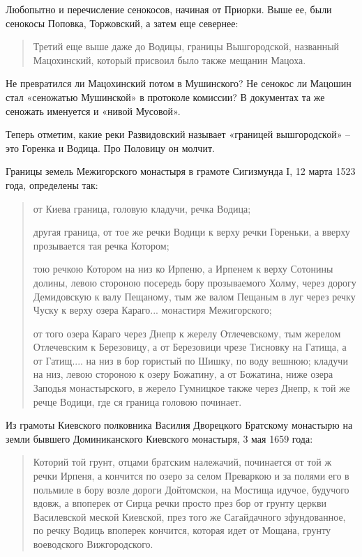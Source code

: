 Любопытно и перечисление сенокосов, начиная от Приорки. Выше ее, были сенокосы Поповка, Торжовский, а затем еще севернее:

\begin{quotation}
Третий еще выше даже до Водицы, границы Вышгородской, названный Мацохинский, который присвоил было также мещанин Мацоха.\end{quotation}

Не превратился ли Мацохинский потом в Мушинского? Не сенокос ли Мацошин стал «сеножатью Мушинской» в протоколе комиссии? В документах та же сеножать именуется и «нивой Мусовой».

Теперь отметим, какие реки Развидовский называет «границей вышгородской» – это Горенка и Водица. Про Половицу он молчит.

Границы земель Межигорского монастыря в грамоте Сигизмунда I, 12 марта 1523 года, определены так:

\begin{quotation}
от Киева граница, головую кладучи, речка Водица;

другая граница, от тое же речки Водици к верху речки Гореньки, а вверху прозывается тая речка Котором;

тою речкою Котором на низ ко Ирпеню, а Ирпенем к верху Сотонины долины, левою стороною посередь бору прозываемого Холму, через дорогу Демидовскую к валу Пещаному, тым же валом Пещаным в луг через речку Чуску к верху озера Караго... монастиря Межигорского;

от того озера Караго через Днепр к жерелу Отлечевскому, тым жерелом Отлечевским к Березовицу, а от Березовици чрезе Тисновку на Гатища, а от Гатищ.... на низ в бор гористый по Шишку, по воду вешнюю; кладучи на низ, левою стороною к озеру Божатину, а от Божатина, ниже озера Заподья монастырского, в жерело Гумницкое также через Днепр, к той же речце Водици, где ся граница головою починает.
\end{quotation}

Из грамоты Киевского полковника Василия Дворецкого Братскому монастырю на земли бывшего Доминиканского Киевского монастыря, 3 мая 1659 года:

\begin{quotation}
Которий той грунт, отцами братским належачий, починается от той ж речки Ирпеня, а кончится по озеро за селом Преваркою и за полями его в польмиле в бору возле дороги Дойтомскои, на Мостища идучое, будучого вдовж, а впоперек от Сирца речки просто през бор от грунту церкви Василевской меской Киевской, през того же Сагайдачного зфундованное, по речку Водиць впоперек кончится, которая идет от Мощана, грунту воеводского Вижгородского.
\end{quotation}

